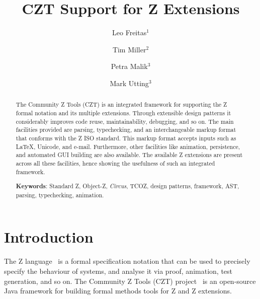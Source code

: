 \documentclass{llncs}
\newcommand{\Circus}{{\sf\slshape Circus}}
\begin{document}
\title{CZT Support for Z Extensions}
\author{Leo Freitas$^1$ \and Tim Miller$^2$ \and Petra Malik$^3$ \and Mark Utting$^3$}


\maketitle


\begin{abstract}
  The Community Z Tools (CZT) is an integrated framework for supporting the Z formal notation
  and its multiple extensions. Through extensible design patterns it considerably improves
  code reuse, maintainability, debugging, and so on.
  The main facilities provided are parsing, typechecking, and an interchangeable markup format
  that conforms with the Z ISO standard. This markup format accepts inputs such as \LaTeX,
  Unicode, and e-mail. Furthermore, other facilities like animation, persistence, and automated
  GUI building are also available.
  The available Z extensions are present across all these facilities, hence showing the
  usefulness of such an integrated framework.

  \noindent
  \textbf{Keywords}: Standard Z, Object-Z, \Circus, TCOZ, design patterns, framework,
                     AST, parsing, typechecking, animation.
\end{abstract}

\section{Introduction} \label{sec:intro}

  The Z language~\cite{isoz} is a formal specification notation that
  can be used to precisely specify the behaviour of systems, and
  analyse it via proof, animation, test generation, and so on.  The Community
  Z Tools (CZT) project~\cite{czt} is an open-source Java framework
  for building formal methods tools for Z and Z extensions.
\end{document}
